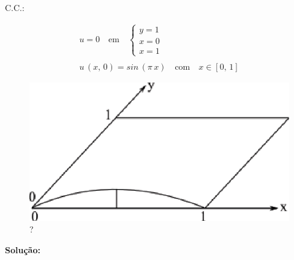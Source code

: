 C.C.:

\[
\begin{array}{l}
 u = 0 \quad \mbox{em} \quad
 \left\{
 \begin{array}{l}
  y = 1 \\
  x = 0 \\
  x = 1
 \end{array} \right. \\
 \\
 u\,(x,\,0) = sin\,(\pi \, x) \quad \mbox{com} \quad x \in [0,\,1]
\end{array}
\]

\begin{figure}[htb]
 \centering
 \includegraphics[scale=1.0]{capitulos/capitulo3/figuras/aprox_der_par_dif_fin1.eps}
 \caption{?}
 \label{fig:aprox_der_par_dif_fin1}
\end{figure}

\textbf{Solução:}

